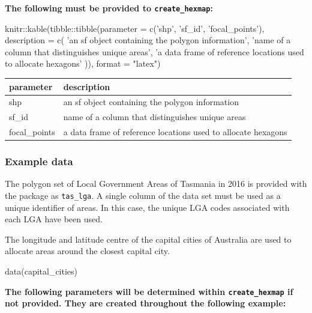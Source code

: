 \textbf{The following must be provided to \texttt{create\_hexmap}:}

\begin{Schunk}
\begin{Sinput}
knitr::kable(tibble::tibble(parameter = c('shp', 
  'sf_id',
  'focal_points'),
  description = c(
    'an sf object containing the polygon information', 
    'name of a column that distinguishes unique areas',
    'a data frame of reference locations used to allocate hexagons'
    )), format = "latex")
\end{Sinput}

\begin{tabular}{l|l}
\hline
parameter & description\\
\hline
shp & an sf object containing the polygon information\\
\hline
sf\_id & name of a column that distinguishes unique areas\\
\hline
focal\_points & a data frame of reference locations used to allocate hexagons\\
\hline
\end{tabular}

\end{Schunk}

\hypertarget{example-data}{%
\subsubsection{Example data}\label{example-data}}

The polygon set of Local Government Areas of Tasmania in 2016 is
provided with the  package as \texttt{tas\_lga}. A
single column of the data set must be used as a unique identifier of
areas. In this case, the unique LGA codes associated with each LGA have
been used.

The longitude and latitude centre of the capital cities of Australia are
used to allocate areas around the closest capital city.

\begin{Schunk}
\begin{Sinput}
data(capital_cities)
\end{Sinput}
\end{Schunk}

\textbf{The following parameters will be determined within
\texttt{create\_hexmap} if not provided. They are created throughout the
following example:}

